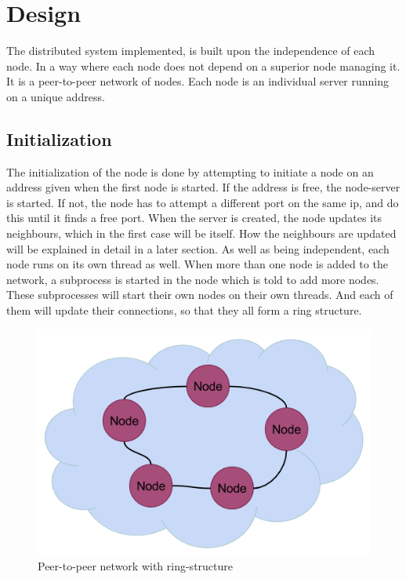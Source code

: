 \section{Design}
The distributed system implemented, is built upon the independence of each node. In a way where each node does not depend on a superior node managing it. It is a peer-to-peer network of nodes. Each node is an individual server running on a unique address.

\subsection{Initialization}
The initialization of the node is done by attempting to initiate a node on an address given when the first node is started. If the address is free, the node-server is started. If not, the node has to attempt a different port on the same ip, and do this until it finds a free port.
When the server is created, the node updates its neighbours, which in the first case will be itself. How the neighbours are updated will be explained in detail in a later section.
As well as being independent, each node runs on its own thread as well.
When more than one node is added to the network, a subprocess is started in the node which is told to add more nodes. These subprocesses will start their own nodes on their own threads. And each of them will update their connections, so that they all form a ring structure.


\begin{figure}[h]
\begin{center}
\includegraphics[scale=.6]
{our_p2p.png}
\end{center}
\caption{Peer-to-peer network with ring-structure}\label{fig:our_p2p}
\end{figure}

